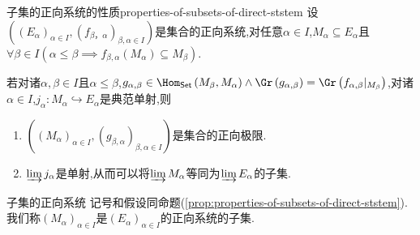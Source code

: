 \begin{proposition}{子集的正向系统的性质}{properties-of-subsets-of-direct-ststem}
	设$\left(\left(E_{\alpha}\right)_{\alpha\in I},\left(f_{\beta，\alpha}\right)_{\beta,\alpha\in I}\right)$是集合的正向系统,对任意$\alpha\in I$,$M_{\alpha}\subseteq E_{\alpha}$且$\forall\beta\in I\left(\alpha\leq\beta\implies f_{\beta,\alpha}\left(M_{\alpha}\right)\subseteq M_{\beta}\right)$.
	
	若对诸$\alpha,\beta\in I$且$\alpha\leq\beta$,$g_{\alpha,\beta}\in\Hom_{\mathsf{Set}}\left(M_{\beta},M_{\alpha}\right)\wedge\Gr\left(g_{\alpha,\beta}\right)=\Gr\left(f_{\alpha,\beta}|_{M_{\beta}}\right)$,对诸$\alpha\in I$,$j_{\alpha}:M_{\alpha}\hookrightarrow E_{\alpha}$是典范单射,则
	\begin{enumerate}
		\item $\left(\left(M_{\alpha}\right)_{\alpha\in I},\left(g_{\beta,\alpha}\right)_{\beta,\alpha\in I}\right)$是集合的正向极限.
		\item $\varinjlim j_{\alpha}$是单射,从而可以将$\varinjlim M_{\alpha}$等同为$\varinjlim E_{\alpha}$的子集.
	\end{enumerate}
\end{proposition}

\begin{definition}{子集的正向系统}{}
	记号和假设同命题(\ref{prop:properties-of-subsets-of-direct-ststem}).我们称$\left(M_{\alpha}\right)_{\alpha\in I}$是$\left(E_{\alpha}\right)_{\alpha\in I}$的正向系统的子集.
\end{definition}

